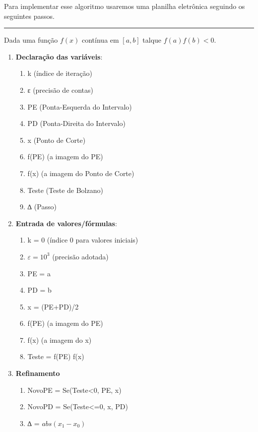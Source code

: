 \documentclass[
  letterpaper,
  DIV=11,
  numbers=noendperiod]{scrreprt}
\providecommand{\tightlist}{%
  \setlength{\itemsep}{0pt}\setlength{\parskip}{0pt}}\usepackage{longtable,booktabs,array}
\begin{document}
Para implementar esse algoritmo usaremos uma planilha eletrônica
seguindo os seguintes passos.

\begin{center}\rule{0.5\linewidth}{0.5pt}\end{center}

Dada uma função \(f(x)\) contínua em \([a,b]\) talque \(f(a)f(b)<0\).

\begin{enumerate}
\def\labelenumi{\arabic{enumi}.}
\tightlist
\item
  \textbf{Declaração das variáveis}:

  \begin{enumerate}
  \def\labelenumii{\alph{enumii})}
  \tightlist
  \item
    k (índice de iteração)
  \item
    ε (precisão de contas)
  \item
    PE (Ponta-Esquerda do Intervalo)
  \item
    PD (Ponta-Direita do Intervalo)
  \item
    x (Ponto de Corte)
  \item
    f(PE) (a imagem do PE)
  \item
    f(x) (a imagem do Ponto de Corte)
  \item
    Teste (Teste de Bolzano)
  \item
    ∆ (Passo)
  \end{enumerate}
\item
  \textbf{Entrada de valores/fórmulas}:

  \begin{enumerate}
  \def\labelenumii{\alph{enumii})}
  \tightlist
  \item
    k = 0 (índice 0 para valores iniciais)
  \item
    \(ε = 10^3\) (precisão adotada)
  \item
    PE = a
  \item
    PD = b
  \item
    x = (PE+PD)/2
  \item
    f(PE) (a imagem do PE)
  \item
    f(x) (a imagem do x)
  \item
    Teste = f(PE) f(x)
  \end{enumerate}
\item
  \textbf{Refinamento}

  \begin{enumerate}
  \def\labelenumii{\alph{enumii})}
  \tightlist
  \item
    NovoPE = Se(Teste\textless0, PE, x)
  \item
    NovoPD = Se(Teste\textless=0, x, PD)
  \item
    ∆ = \(abs(x_{1}-x_{0})\)
  \end{enumerate}
\end{enumerate}
\end{document}
